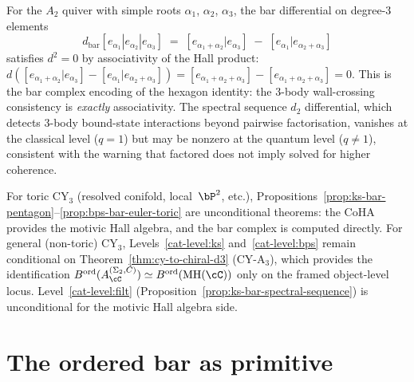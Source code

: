 \begin{remark}
\label{rem:hexagon-bar-degree-3}
For the $A_2$ quiver with simple roots $\alpha_1$, $\alpha_2$, $\alpha_3$, the bar differential on degree-$3$ elements
\[
 d_{\mathrm{bar}}[e_{\alpha_1} | e_{\alpha_2} | e_{\alpha_3}] \;=\; [e_{\alpha_1 + \alpha_2} | e_{\alpha_3}] \;-\; [e_{\alpha_1} | e_{\alpha_2 + \alpha_3}]
\]
satisfies $d^2 = 0$ by associativity of the Hall product: $d([e_{\alpha_1 + \alpha_2} | e_{\alpha_3}] - [e_{\alpha_1} | e_{\alpha_2 + \alpha_3}]) = [e_{\alpha_1+\alpha_2+\alpha_3}] - [e_{\alpha_1+\alpha_2+\alpha_3}] = 0$. This is the bar complex encoding of the hexagon identity: the $3$-body wall-crossing consistency is \emph{exactly} associativity. The spectral sequence $d_2$ differential, which detects $3$-body bound-state interactions beyond pairwise factorisation, vanishes at the classical level ($q = 1$) but may be nonzero at the quantum level ($q \neq 1$), consistent with the warning that factored does not imply solved for higher coherence.
\end{remark}

\begin{remark}
\label{rem:ks-bar-scope}
For toric CY$_3$ (resolved conifold, local~$\bP^2$, etc.), Propositions~\ref{prop:ks-bar-pentagon}--\ref{prop:bps-bar-euler-toric} are unconditional theorems: the CoHA provides the motivic Hall algebra, and the bar complex is computed directly. For general (non-toric) CY$_3$, Levels~\ref{cat-level:ks} and~\ref{cat-level:bps} remain conditional on Theorem~\ref{thm:cy-to-chiral-d3} (CY-A$_3$), which provides the identification $B^{\mathrm{ord}}(A_\cC^{(\Sigma_2,C)}) \simeq B^{\mathrm{ord}}(\mathrm{MH}(\cC))$ only on the framed object-level locus. Level~\ref{cat-level:filt} (Proposition~\ref{prop:ks-bar-spectral-sequence}) is unconditional for the motivic Hall algebra side.
\end{remark}


\section{The ordered bar as primitive}
\label{sec:closing-primitive}

